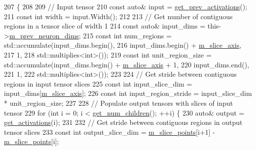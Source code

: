 \begin{DoxyCode}
207                         \{
208 
209     \textcolor{comment}{// Input tensor}
210     \textcolor{keyword}{const} \textcolor{keyword}{auto}& input = \hyperlink{classlbann_1_1Layer_a45853df73a2e72bfaa774665a0f37ed7}{get\_prev\_activations}();
211     \textcolor{keyword}{const} \textcolor{keywordtype}{int} width = input.Width();
212 
213     \textcolor{comment}{// Get number of contiguous regions in a tensor slice of width 1}
214     \textcolor{keyword}{const} \textcolor{keyword}{auto}& input\_dims = this->\hyperlink{classlbann_1_1Layer_ae204d1a2a79606eaa117273857ff62a3}{m\_prev\_neuron\_dims};
215     \textcolor{keyword}{const} \textcolor{keywordtype}{int} num\_regions = std::accumulate(input\_dims.begin(),
216                                             input\_dims.begin() + \hyperlink{classlbann_1_1slice__layer_a349dcd71f67d77d40247da24e4641ea2}{m\_slice\_axis},
217                                             1,
218                                             std::multiplies<int>());
219     \textcolor{keyword}{const} \textcolor{keywordtype}{int} unit\_region\_size = std::accumulate(input\_dims.begin() + 
      \hyperlink{classlbann_1_1slice__layer_a349dcd71f67d77d40247da24e4641ea2}{m\_slice\_axis} + 1,
220                                                  input\_dims.end(),
221                                                  1,
222                                                  std::multiplies<int>());
223 
224     \textcolor{comment}{// Get stride between contiguous regions in input tensor slices}
225     \textcolor{keyword}{const} \textcolor{keywordtype}{int} input\_slice\_dim = input\_dims[\hyperlink{classlbann_1_1slice__layer_a349dcd71f67d77d40247da24e4641ea2}{m\_slice\_axis}];
226     \textcolor{keyword}{const} \textcolor{keywordtype}{int} input\_region\_stride = input\_slice\_dim * unit\_region\_size;
227     
228     \textcolor{comment}{// Populate output tensors with slices of input tensor}
229     \textcolor{keywordflow}{for} (\textcolor{keywordtype}{int} i = 0; i < \hyperlink{classlbann_1_1Layer_a1409a117c31a7ea4f2c7a4d22a3e86c3}{get\_num\_children}(); ++i) \{
230       \textcolor{keyword}{auto}& output = \hyperlink{classlbann_1_1Layer_a1134b1a4385af199d7272c5aa827fa99}{get\_activations}(i);
231 
232       \textcolor{comment}{// Get stride between contiguous regions in output tensor slices}
233       \textcolor{keyword}{const} \textcolor{keywordtype}{int} output\_slice\_dim = \hyperlink{classlbann_1_1slice__layer_af79dab13a70da2e81209e7ae15166e30}{m\_slice\_points}[i+1] - 
      \hyperlink{classlbann_1_1slice__layer_af79dab13a70da2e81209e7ae15166e30}{m\_slice\_points}[i];

\end{DoxyCode}
